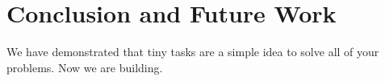 \section{Conclusion and Future Work}
We have demonstrated that tiny tasks are a simple idea to solve all of your
problems. Now we are building.
